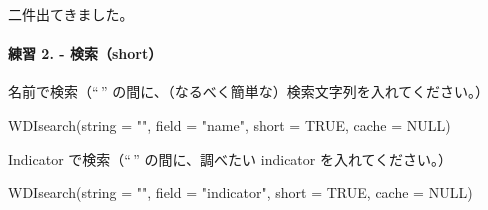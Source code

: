 \documentclass[
]{bxjsbook}
\newenvironment{Shaded}{\begin{snugshade}}{\end{snugshade}}
\newcommand{\AttributeTok}[1]{\textcolor[rgb]{0.77,0.63,0.00}{#1}}
\newcommand{\CommentTok}[1]{\textcolor[rgb]{0.56,0.35,0.01}{\textit{#1}}}
\newcommand{\ConstantTok}[1]{\textcolor[rgb]{0.00,0.00,0.00}{#1}}
\newcommand{\FunctionTok}[1]{\textcolor[rgb]{0.00,0.00,0.00}{#1}}
\newcommand{\NormalTok}[1]{#1}
\newcommand{\StringTok}[1]{\textcolor[rgb]{0.31,0.60,0.02}{#1}}
\theoremstyle{definition}
\theoremstyle{definition}
\theoremstyle{definition}
\theoremstyle{definition}
\theoremstyle{remark}
\begin{document}
\begin{Shaded}
\end{Shaded}

二件出てきました。

\hypertarget{ux7df4ux7fd2-2.---ux691cux7d22short}{%
\paragraph{練習 2. - 検索（short）}\label{ux7df4ux7fd2-2.---ux691cux7d22short}}

名前で検索（``\,'' の間に、（なるべく簡単な）検索文字列を入れてください。）

\begin{Shaded}
\begin{Highlighting}[]
\FunctionTok{WDIsearch}\NormalTok{(}\AttributeTok{string =} \StringTok{""}\NormalTok{, }\AttributeTok{field =} \StringTok{"name"}\NormalTok{, }\AttributeTok{short =} \ConstantTok{TRUE}\NormalTok{, }\AttributeTok{cache =} \ConstantTok{NULL}\NormalTok{)}
\end{Highlighting}
\end{Shaded}

Indicator で検索（``\,'' の間に、調べたい indicator を入れてください。）

\begin{Shaded}
\begin{Highlighting}[]
\FunctionTok{WDIsearch}\NormalTok{(}\AttributeTok{string =} \StringTok{""}\NormalTok{, }\AttributeTok{field =} \StringTok{"indicator"}\NormalTok{, }\AttributeTok{short =} \ConstantTok{TRUE}\NormalTok{, }\AttributeTok{cache =} \ConstantTok{NULL}\NormalTok{)}
\end{Highlighting}
\end{Shaded}
\end{document}
